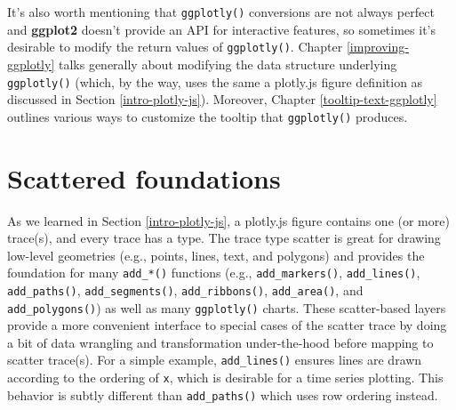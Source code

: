 \documentclass[
  12pt,
]{krantz}
\newenvironment{Shaded}{\begin{snugshade}}{\end{snugshade}}
\newcommand{\CommentTok}[1]{\textcolor[rgb]{0.56,0.35,0.01}{\textit{#1}}}
\newcommand{\DataTypeTok}[1]{\textcolor[rgb]{0.13,0.29,0.53}{#1}}
\newcommand{\KeywordTok}[1]{\textcolor[rgb]{0.13,0.29,0.53}{\textbf{#1}}}
\newcommand{\NormalTok}[1]{#1}
\newcommand{\OperatorTok}[1]{\textcolor[rgb]{0.81,0.36,0.00}{\textbf{#1}}}
\newcommand{\StringTok}[1]{\textcolor[rgb]{0.31,0.60,0.02}{#1}}
\begin{document}
It's also worth mentioning that \texttt{ggplotly()} conversions are not always perfect and \textbf{ggplot2} doesn't provide an API for interactive features, so sometimes it's desirable to modify the return values of \texttt{ggplotly()}. Chapter \ref{improving-ggplotly} talks generally about modifying the data structure underlying \texttt{ggplotly()} (which, by the way, uses the same a plotly.js figure definition as discussed in Section \ref{intro-plotly-js}). Moreover, Chapter \ref{tooltip-text-ggplotly} outlines various ways to customize the tooltip that \texttt{ggplotly()} produces.

\hypertarget{scatter-traces}{%
\chapter{Scattered foundations}\label{scatter-traces}}

As we learned in Section \ref{intro-plotly-js}, a plotly.js figure contains one (or more) trace(s), and every trace has a type. The trace type scatter is great for drawing low-level geometries (e.g., points, lines, text, and polygons) and provides the foundation for many \texttt{add\_*()} functions (e.g., \texttt{add\_markers()}, \texttt{add\_lines()}, \texttt{add\_paths()}, \texttt{add\_segments()}, \texttt{add\_ribbons()}, \texttt{add\_area()}, and \texttt{add\_polygons()}) as well as many \texttt{ggplotly()} charts. These scatter-based layers provide a more convenient interface to special cases of the scatter trace by doing a bit of data wrangling and transformation under-the-hood before mapping to scatter trace(s). For a simple example, \texttt{add\_lines()} ensures lines are drawn according to the ordering of \texttt{x}, which is desirable for a time series plotting. This behavior is subtly different than \texttt{add\_paths()} which uses row ordering instead.

\begin{Shaded}
\end{Shaded}
\end{document}
